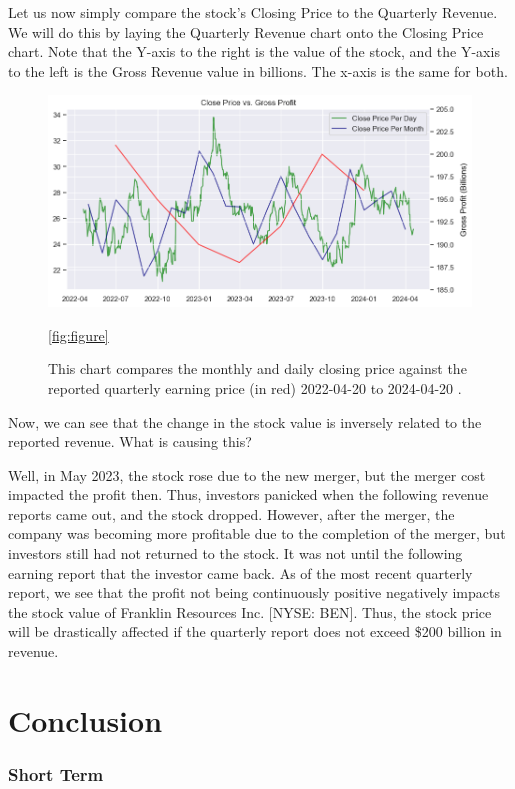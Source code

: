 \documentclass[9pt,a4paper,twoside]{tau}
\begin{document}
        Let us now simply compare the stock's Closing Price to the Quarterly Revenue. We will do this by laying the Quarterly Revenue chart onto the Closing Price chart. Note that the Y-axis to the right is the value of the stock, and the Y-axis to the left is the Gross Revenue value in billions. The x-axis is the same for both.
            \begin{figure}[H]
                \centering
                \includegraphics[width=0.85\columnwidth]{Figures/CloseDataVsProfit.png}
                \caption{This chart compares the monthly and daily closing price against the reported quarterly earning price (in red) 2022-04-20 to 2024-04-20 \cite{yahoo-finance-2024} \cite{alpha-vantage-2024}.}
                \ref{fig:figure}
            \end{figure}
        
        Now, we can see that the change in the stock value is inversely related to the reported revenue. What is causing this?

        Well, in May 2023, the stock rose due to the new merger, but the merger cost impacted the profit then. Thus, investors panicked when the following revenue reports came out, and the stock dropped. However, after the merger, the company was becoming more profitable due to the completion of the merger, but investors still had not returned to the stock. It was not until the following earning report that the investor came back. As of the most recent quarterly report, we see that the profit not being continuously positive negatively impacts the stock value of Franklin Resources Inc. [NYSE: BEN]. Thus, the stock price will be drastically affected if the quarterly report does not exceed \$200 billion in revenue. 

\section{Conclusion}
    \subsubsection{Short Term}
    
\end{document}
